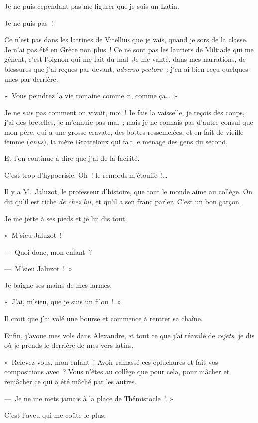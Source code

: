 \documentclass[french,twoside]{book} %
\begin{document}
Je ne puis cependant pas me figurer que je suis un Latin.\par
Je ne puis pas !\par
Ce n’est pas dans les latrines de Vitellius que je vais, quand je sors de la classe. Je n’ai pas été en Grèce non plus ! Ce ne sont pas les lauriers de Miltiade qui me gênent, c’est l’oignon qui me fait du mal. Je me vante, dans mes narrations, de blessures que j’ai reçues par devant, \emph{adverso pectore ;} j’en ai bien reçu quelques-unes par derrière.\par
« Vous peindrez la vie romaine comme ci, comme ça… »\par
Je ne sais pas comment on vivait, moi ! Je fais la vaisselle, je reçois des coups, j’ai des bretelles, je m’ennuie pas mal ; mais je ne connais pas d’autre consul que mon père, qui a une grosse cravate, des bottes ressemelées, et en fait de vieille femme (\emph{anus}), la mère Gratteloux qui fait le ménage des gens du second.\par
Et l’on continue à dire que j’ai de la facilité.\par
\bigbreak
\noindent C’est trop d’hypocrisie. Oh ! le remords m’étouffe !…\par
Il y a M. Jaluzot, le professeur d’histoire, que tout le monde aime au collège. On dit qu’il est riche \emph{de chez lui}, et qu’il a son franc parler. C’est un bon garçon.\par
Je me jette à ses pieds et je lui dis tout.\par
« M’sieu Jaluzot !\par
— Quoi donc, mon enfant ?\par
— M’sieu Jaluzot ! »\par
Je baigne ses mains de mes larmes.\par
« J’ai, m’sieu, que je suis un filou ! »\par
Il croit que j’ai volé une bourse et commence à rentrer sa chaîne.\par
Enfin, j’avoue mes vols dans Alexandre, et tout ce que j’ai réavalé de \emph{rejets}, je dis où je prends le derrière de mes vers latins.\par
« Relevez-vous, mon enfant ! Avoir ramassé ces épluchures et fait vos compositions avec ? Vous n’êtes au collège que pour cela, pour mâcher et remâcher ce qui a été mâché par les autres.\par
— Je ne me mets jamais à la place de Thémistocle ! »\par
C’est l’aveu qui me coûte le plus.\par
\end{document}
